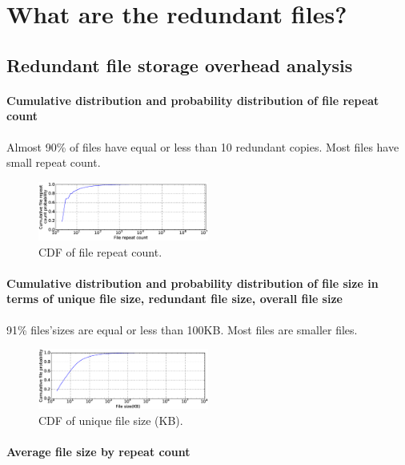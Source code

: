 
\section{What are the redundant files?}
\label{sec:redundant_files}

\subsection{Redundant file storage overhead analysis}

\paragraph{Cumulative distribution and probability distribution of file repeat count}

Almost 90\% of files have equal or less than 10 redundant copies. Most files have small repeat count.

\begin{figure}
	\centering
	\includegraphics[width=0.5\textwidth]{graphs/File_repeat_count.eps}
	\caption{CDF of file repeat count.
	}
	\label{fig_file_repeat_count}
\end{figure}

\paragraph{Cumulative distribution and probability distribution of file size in terms of unique file size, redundant file size, overall file size}

91\% files'sizes are equal or less than 100KB. Most files are smaller files.

\begin{figure}
	\centering
	\includegraphics[width=0.5\textwidth]{graphs/File_size-KB.eps}
	\caption{CDF of unique file size (KB).
	}
	\label{fig_file_size}
\end{figure}

\paragraph{Average file size by repeat count}

